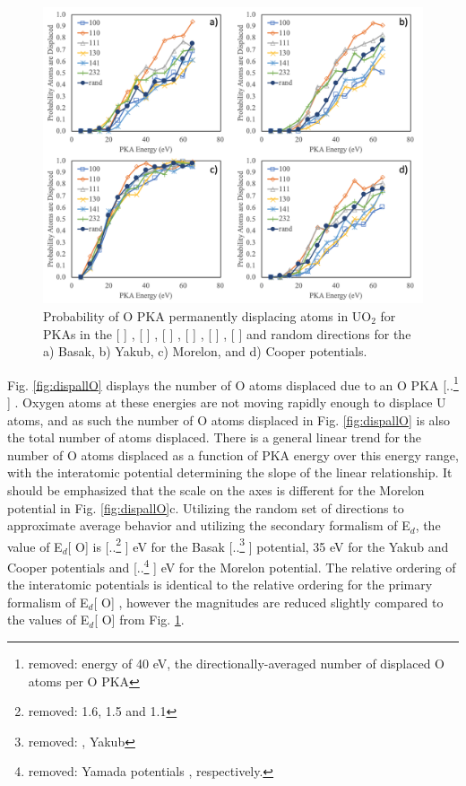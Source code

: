 \documentclass[review]{elsarticle} %
\providecommand{\DIFaddtex}[1]{{\protect\color{blue} \sf #1}} %
\providecommand{\DIFdeltex}[1]{{\protect\color{red} [..\footnote{removed: #1} ]}} %
\providecommand{\DIFaddbegin}{} %
\providecommand{\DIFaddend}{} %
\providecommand{\DIFdelbegin}{} %
\providecommand{\DIFdelend}{} %
\providecommand{\DIFaddFL}[1]{\DIFadd{#1}} %
\providecommand{\DIFadd}[1]{\texorpdfstring{\DIFaddtex{#1}}{#1}} %
\providecommand{\DIFdel}[1]{\texorpdfstring{\DIFdeltex{#1}}{}} %
\newcommand{\DIFscaledelfig}{0.5}
\newlength{\DIFdelgraphicswidth} %
\newlength{\DIFdelgraphicsheight} %
\newcommand{\DIFaddincludegraphics}[2][]{{\color{blue}\fbox{\DIFOincludegraphics[#1]{#2}}}} %
\newcommand{\DIFdelincludegraphics}[2][]{%
\sbox{\DIFdelgraphicsbox}{\DIFOincludegraphics[#1]{#2}}%
\settoboxwidth{\DIFdelgraphicswidth}{\DIFdelgraphicsbox} %
\settoboxtotalheight{\DIFdelgraphicsheight}{\DIFdelgraphicsbox} %
\scalebox{\DIFscaledelfig}{%
\parbox[b]{\DIFdelgraphicswidth}{\usebox{\DIFdelgraphicsbox}\\[-\baselineskip] \rule{\DIFdelgraphicswidth}{0em}}\llap{\resizebox{\DIFdelgraphicswidth}{\DIFdelgraphicsheight}{%
\setlength{\unitlength}{\DIFdelgraphicswidth}%
\begin{picture}(1,1)%
\thicklines\linethickness{2pt} %
{\color[rgb]{1,0,0}\put(0,0){\framebox(1,1){}}}%
{\color[rgb]{1,0,0}\put(0,0){\line( 1,1){1}}}%
{\color[rgb]{1,0,0}\put(0,1){\line(1,-1){1}}}%
\end{picture}%
}\hspace*{3pt}}} %
} %
\DeclareRobustCommand{\DIFaddbegin}{\DIFOaddbegin \let\includegraphics\DIFaddincludegraphics} %
\DeclareRobustCommand{\DIFaddend}{\DIFOaddend \let\includegraphics\DIFOincludegraphics} %
\DeclareRobustCommand{\DIFdelbegin}{\DIFOdelbegin \let\includegraphics\DIFdelincludegraphics} %
\DeclareRobustCommand{\DIFdelend}{\DIFOaddend \let\includegraphics\DIFOincludegraphics} %
\begin{document}
\begin{figure}[h]
 \centering
 \includegraphics[width=1.0\textwidth]{dispO.png}
 \caption{\DIFaddFL{Probability of O PKA permanently displacing atoms in UO$_2$ for PKAs in the }[\DIFaddFL{100}]\DIFaddFL{, }[\DIFaddFL{110}]\DIFaddFL{, }[\DIFaddFL{111}]\DIFaddFL{, }[\DIFaddFL{130}]\DIFaddFL{, }[\DIFaddFL{141}]\DIFaddFL{, }[\DIFaddFL{232}] \DIFaddFL{and random directions for the a) Basak, b) Yakub, c) Morelon, and d) Cooper potentials.}}
 \label{fig:dispO}
\end{figure}

\FloatBarrier

\DIFadd{Fig. \ref{fig:dispallO} displays the number of O atoms displaced due to }\DIFaddend an O PKA\DIFdelbegin \DIFdel{energy of 40 eV, the directionally-averaged number of displaced O atoms per O PKA }\DIFdelend \DIFaddbegin \DIFadd{. Oxygen atoms at these energies are not moving rapidly enough to displace U atoms, and as such the number of O atoms displaced in Fig. \ref{fig:dispallO} is also the total number of atoms displaced. There is a general linear trend for the number of O atoms displaced as a function of PKA energy over this energy range, with the interatomic potential determining the slope of the linear relationship. It should be emphasized that the scale on the axes is different for the Morelon potential in Fig. \ref{fig:dispallO}c. Utilizing the random set of directions to approximate average behavior and utilizing the secondary formalism of E$_d$, the value of E$_d$}[\DIFadd{O}] \DIFaddend is \DIFdelbegin \DIFdel{1.6, 1.5 and 1.1 }\DIFdelend \DIFaddbegin \DIFadd{30 eV }\DIFaddend for the Basak \DIFdelbegin \DIFdel{, Yakub }\DIFdelend \DIFaddbegin \DIFadd{potential, 35 eV for the Yakub and Cooper potentials }\DIFaddend and \DIFdelbegin \DIFdel{Yamada potentials , respectively. }\DIFdelend \DIFaddbegin \DIFadd{15 eV for the Morelon potential. The relative ordering of the interatomic potentials is identical to the relative ordering for the primary formalism of E$_d$}[\DIFadd{O}]\DIFadd{, however the magnitudes are reduced slightly compared to the values of E$_d$}[\DIFadd{O}] \DIFadd{from Fig. \ref{fig:dispO}.
}\DIFaddend 
\end{document}
